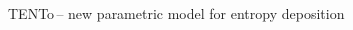 \documentclass[svgnames]{beamer}
\newcommand{\trento}{T\raisebox{-.5ex}{R}ENTo}
\begin{document}
\begin{frame}{\trento \,-- new parametric model for entropy deposition}
\begin{textblock*}{0.5\linewidth}
   \end{textblock*}
\end{frame}

\end{document}
